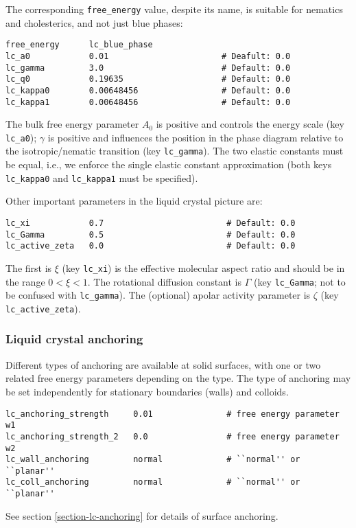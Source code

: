 The corresponding \texttt{free\_energy} value, despite its name, is
suitable for nematics and cholesterics, and not just blue phases:
\begin{lstlisting}
free_energy      lc_blue_phase
lc_a0            0.01                       # Deafult: 0.0
lc_gamma         3.0                        # Default: 0.0
lc_q0            0.19635                    # Default: 0.0
lc_kappa0        0.00648456                 # Default: 0.0
lc_kappa1        0.00648456                 # Default: 0.0
\end{lstlisting}
The bulk free energy parameter $A_0$ is positive and controls the
energy scale (key \texttt{lc\_a0}); $\gamma$ is positive and
influences the position in the phase diagram relative to the
isotropic/nematic transition (key \texttt{lc\_gamma}).
The two elastic constants must be equal, i.e., we enforce the
single elastic constant approximation (both keys \texttt{lc\_kappa0} and
\texttt{lc\_kappa1} must be specified).

Other important parameters in the liquid crystal picture are:
\begin{lstlisting}
lc_xi            0.7                         # Default: 0.0
lc_Gamma         0.5                         # Default: 0.0
lc_active_zeta   0.0                         # Default: 0.0
\end{lstlisting}
The first is $\xi$ (key \texttt{lc\_xi}) is the effective molecular
aspect ratio and should be in the range $0< \xi< 1$. The rotational
diffusion constant is $\Gamma$ (key \texttt{lc\_Gamma}; not to be
confused with \texttt{lc\_gamma}). The (optional) apolar activity
parameter is $\zeta$ (key \texttt{lc\_active\_zeta}).

\subsubsection{Liquid crystal anchoring}

Different types of anchoring are available at solid surfaces, with
one or two related free energy parameters depending on the type.
The type of anchoring may be set independently for stationary
boundaries (walls) and colloids.
\begin{lstlisting}
lc_anchoring_strength     0.01               # free energy parameter w1
lc_anchoring_strength_2   0.0                # free energy parameter w2
lc_wall_anchoring         normal             # ``normal'' or ``planar''
lc_coll_anchoring         normal             # ``normal'' or ``planar''
\end{lstlisting}
See section \ref{section-lc-anchoring} for details of surface anchoring.

